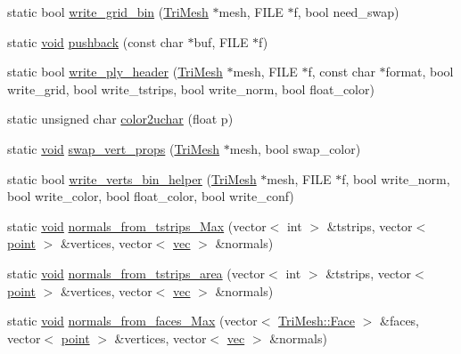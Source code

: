 \begin{DoxyCompactItemize}
static bool \hyperlink{namespacetrimesh_a35807463091f1c41203f2e4580460ce4}{write\+\_\+grid\+\_\+bin} (\hyperlink{classtrimesh_1_1TriMesh}{Tri\+Mesh} $\ast$mesh, F\+I\+LE $\ast$f, bool need\+\_\+swap)
\item 
static \hyperlink{namespacetrimesh_a784ddfd979e1c579bda795a8edfc3f43}{void} \hyperlink{namespacetrimesh_a06aac2116003fae62ad2051991af5845}{pushback} (const char $\ast$buf, F\+I\+LE $\ast$f)
\item 
static bool \hyperlink{namespacetrimesh_a40f3489c91c9410ab262e406cb3256d2}{write\+\_\+ply\+\_\+header} (\hyperlink{classtrimesh_1_1TriMesh}{Tri\+Mesh} $\ast$mesh, F\+I\+LE $\ast$f, const char $\ast$format, bool write\+\_\+grid, bool write\+\_\+tstrips, bool write\+\_\+norm, bool float\+\_\+color)
\item 
static unsigned char \hyperlink{namespacetrimesh_ab7c50c76936cfb1b17e841546b2e5d0a}{color2uchar} (float p)
\item 
static \hyperlink{namespacetrimesh_a784ddfd979e1c579bda795a8edfc3f43}{void} \hyperlink{namespacetrimesh_abcf520cc53667bb3201c1c7cae2dd993}{swap\+\_\+vert\+\_\+props} (\hyperlink{classtrimesh_1_1TriMesh}{Tri\+Mesh} $\ast$mesh, bool swap\+\_\+color)
\item 
static bool \hyperlink{namespacetrimesh_aac722bf617598a0ca0b218bba6b07bb7}{write\+\_\+verts\+\_\+bin\+\_\+helper} (\hyperlink{classtrimesh_1_1TriMesh}{Tri\+Mesh} $\ast$mesh, F\+I\+LE $\ast$f, bool write\+\_\+norm, bool write\+\_\+color, bool float\+\_\+color, bool write\+\_\+conf)
\item 
static \hyperlink{namespacetrimesh_a784ddfd979e1c579bda795a8edfc3f43}{void} \hyperlink{namespacetrimesh_a1d7c94dce3c861a15780c890a18c9e2c}{normals\+\_\+from\+\_\+tstrips\+\_\+\+Max} (vector$<$ int $>$ \&tstrips, vector$<$ \hyperlink{namespacetrimesh_a325b99fd6454b22fa4c4bc3223271b2c}{point} $>$ \&vertices, vector$<$ \hyperlink{namespacetrimesh_a4fc2b83feba99c931f837a0c7d4b4df1}{vec} $>$ \&normals)
\item 
static \hyperlink{namespacetrimesh_a784ddfd979e1c579bda795a8edfc3f43}{void} \hyperlink{namespacetrimesh_a80dff89e7d68e0131963211753ae0e4a}{normals\+\_\+from\+\_\+tstrips\+\_\+area} (vector$<$ int $>$ \&tstrips, vector$<$ \hyperlink{namespacetrimesh_a325b99fd6454b22fa4c4bc3223271b2c}{point} $>$ \&vertices, vector$<$ \hyperlink{namespacetrimesh_a4fc2b83feba99c931f837a0c7d4b4df1}{vec} $>$ \&normals)
\item 
static \hyperlink{namespacetrimesh_a784ddfd979e1c579bda795a8edfc3f43}{void} \hyperlink{namespacetrimesh_a1b5789b29f63886b4c31128730373bbb}{normals\+\_\+from\+\_\+faces\+\_\+\+Max} (vector$<$ \hyperlink{classtrimesh_1_1TriMesh_a06cb64bb6435d5cf4d7b24d2950fe8e7}{Tri\+Mesh\+::\+Face} $>$ \&faces, vector$<$ \hyperlink{namespacetrimesh_a325b99fd6454b22fa4c4bc3223271b2c}{point} $>$ \&vertices, vector$<$ \hyperlink{namespacetrimesh_a4fc2b83feba99c931f837a0c7d4b4df1}{vec} $>$ \&normals)

\end{DoxyCompactItemize}
